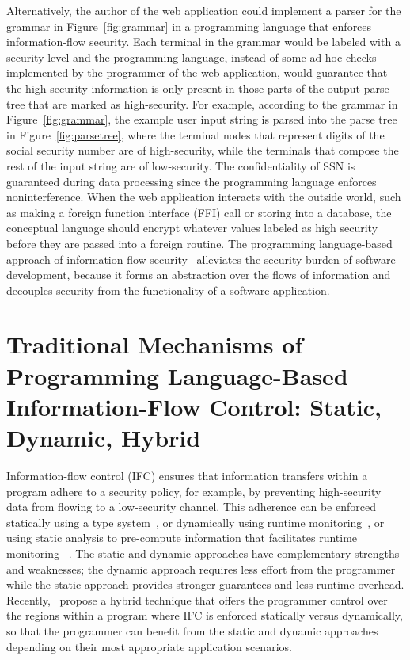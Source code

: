 Alternatively, the author of the web application could implement a parser for
the grammar in Figure~\ref{fig:grammar} in a programming language that enforces
information-flow security. Each terminal in the grammar would be labeled with a
security level and the programming language, instead of some ad-hoc checks
implemented by the programmer of the web application, would guarantee that the
high-security information is only present in those parts of the output parse
tree that are marked as high-security. For example, according to the grammar in
Figure~\ref{fig:grammar}, the example user input string is parsed into the parse
tree in Figure~\ref{fig:parsetree}, where the terminal nodes that represent
digits of the social security number are of {\color{red} high-security}, while
the terminals that compose the rest of the input string are of {\color{green}
  low-security}. The confidentiality of SSN is guaranteed during data processing
since the programming language enforces noninterference. When the web
application interacts with the outside world, such as making a foreign function
interface (FFI) call or storing into a database, the conceptual language should
encrypt whatever values labeled as high security before they are passed into a
foreign routine. The programming language-based approach of information-flow
security~\parencite{sabelfeld2003language} alleviates the security burden of
software development, because it forms an abstraction over the flows of
information and decouples security from the functionality of a software
application.


\section{Traditional Mechanisms of Programming Language-Based
         Information-Flow Control: Static, Dynamic, Hybrid}


Information-flow control (IFC) ensures that information transfers within a
program adhere to a security policy, for example, by preventing high-security
data from flowing to a low-security channel. This adherence can be enforced
statically using a type
system~\parencite{volpano1996sound,Myers:1997aa,myers1999jflow}, or dynamically
using runtime
monitoring~\parencite{Askarov:2009vq,austin2009efficient,Devriese:2010up,stefan2011flexible,Austin:2017uh,Xiang:2021ub},
or using static analysis to pre-compute information that facilitates runtime
monitoring
~\parencite{le2005monitoring,le2007automaton,Chandra:2007we,Shroff:2007tg,russo2010dynamic,moore2011static}.
The static and dynamic approaches have complementary strengths and weaknesses;
the dynamic approach requires less effort from the programmer while the static
approach provides stronger guarantees and less runtime overhead.
Recently,~\textcite{Buiras:2015aa} propose a hybrid technique that offers the
programmer control over the regions within a program where IFC is enforced
statically versus dynamically, so that the programmer can benefit from the
static and dynamic approaches depending on their most appropriate application
scenarios.

